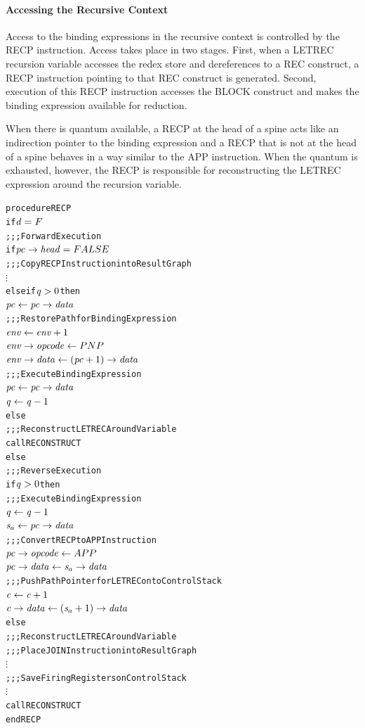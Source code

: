 \paragraph{Accessing the Recursive Context}
Access to the binding expressions in the recursive context is controlled by the RECP
instruction. Access takes place in two stages. First, when a LETREC recursion variable
accesses the redex store and dereferences to a REC construct, a RECP instruction pointing
to that REC construct is generated. Second, execution of this RECP instruction accesses the
BLOCK construct and makes the binding expression available for reduction.


When there is quantum available, a RECP at the head of a spine acts like an indirection
pointer to the binding expression and a RECP that is not at the head of a spine behaves in
a way similar to the APP instruction. When the quantum is exhausted, however, the RECP is
responsible for reconstructing the LETREC expression around the recursion variable.

\begin{alltt}
procedure RECP
  if \(\rt{d} = F\)
    ;;; Forward Execution
    if \(\rtfield{pc}{head} = FALSE\)
      ;;; Copy RECP Instruction into Result Graph
      \(\vdots\)
    else if \(\rt{q} > 0\) then
      \(\rt{pc} \leftarrow \rtfield{pc}{data}\)
      ;;; Restore Path for Binding Expression
      \(\rt{env} \leftarrow \rt{env}+1\)
      \(\rtfield{env}{opcode} \leftarrow PNP\)
      \(\rtfield{env}{data} \leftarrow (\rt{pc}+1)\rightarrow\mathit{data}\)
      ;;; Execute Binding Expression
      \(\rt{pc} \leftarrow \rtfield{pc}{data}\)
      \(\rt{q} \leftarrow \rt{q}-1\)
    else
      ;;; Reconstruct LETREC Around Variable
      call RECONSTRUCT
  else
    ;;; Reverse Execution
    if \(\rt{q} > 0\) then
      ;;; Execute Binding Expression
      \(\rt{q} \leftarrow \rt{q}-1\)
      \(\rtsa \leftarrow \rtfield{pc}{data}\)
      ;;; Convert RECP to APP Instruction
      \(\rtfield{pc}{opcode} \leftarrow APP\)
      \(\rtfield{pc}{data} \leftarrow \rtsa\rightarrow\mathit{data}\)
      ;;; Push Path Pointer for LETREC onto Control Stack
      \(\rt{c} \leftarrow \rt{c}+1\)
      \(\rtfield{c}{data} \leftarrow (\rtsa+1)\rightarrow\mathit{data}\)
    else
      ;;; Reconstruct LETREC Around Variable
      ;;; Place JOIN Instruction into Result Graph
      \(\vdots\)
      ;;; Save Firing Registers on Control Stack
      \(\vdots\)
      call RECONSTRUCT
end RECP
\end{alltt}

